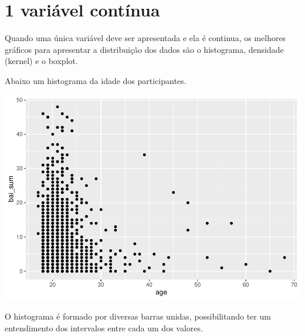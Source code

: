 \documentclass[
]{book}
\newenvironment{Shaded}{\begin{snugshade}}{\end{snugshade}}
\newcommand{\DataTypeTok}[1]{\textcolor[rgb]{0.13,0.29,0.53}{#1}}
\newcommand{\DecValTok}[1]{\textcolor[rgb]{0.00,0.00,0.81}{#1}}
\newcommand{\KeywordTok}[1]{\textcolor[rgb]{0.13,0.29,0.53}{\textbf{#1}}}
\newcommand{\NormalTok}[1]{#1}
\newcommand{\OperatorTok}[1]{\textcolor[rgb]{0.81,0.36,0.00}{\textbf{#1}}}
\newcommand{\StringTok}[1]{\textcolor[rgb]{0.31,0.60,0.02}{#1}}
\begin{document}
\hypertarget{variuxe1vel-contuxednua}{%
\section{1 variável contínua}\label{variuxe1vel-contuxednua}}

Quando uma única variável deve ser apresentada e ela é continua, os melhores gráficos para apresentar a distribuição dos dados são o histograma, densidade (kernel) e o boxplot.

Abaixo um histograma da idade dos participantes.

\begin{Shaded}
\end{Shaded}

\begin{center}\includegraphics{gitbook-demo_files/figure-latex/unnamed-chunk-22-1} \end{center}

O histograma é formado por diversas barras unidas, possibilitando ter um entendimento dos intervalos entre cada um dos valores.
\end{document}
